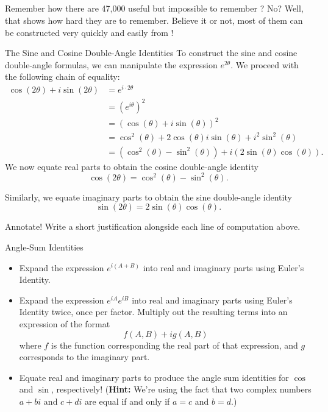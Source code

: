 \subsection{}

Remember how there are 47,000 useful but impossible to remember ?  No?  Well, that shows how hard they are to remember.  Believe it or not, most of them can be constructed very quickly and easily from !  

\begin{example}{The Sine and Cosine Double-Angle Identities}
To construct the sine and cosine double-angle formulas, we can manipulate the expression $e^{2\theta}$.  We proceed with the following chain of equality:
\begin{align*}
\cos(2\theta)+i\sin(2\theta)&=e^{i\cdot 2\theta} \\
&=\left(e^{i\theta} \right)^2 \\
&=\left(\cos(\theta)+i\sin(\theta) \right)^2\\ 
&=\cos^2(\theta)+2\cos(\theta)i\sin(\theta)+i^2\sin^2(\theta)  \\
&=\left(\cos^2(\theta)-\sin^2(\theta)\right)+i\left(2\sin(\theta)\cos(\theta) \right). 
\end{align*}
We now equate real parts to obtain the cosine double-angle identity $$\cos(2\theta)=\cos^2(\theta)-\sin^2(\theta). $$

Similarly, we equate imaginary parts to obtain the sine double-angle identity
$$\sin(2\theta)=2\sin(\theta)\cos(\theta). $$
\end{example}

\begin{exercise}{Annotate! \Coffeecup}
Write a short justification alongside each line of computation above.
\end{exercise}

\begin{exercise}{Angle-Sum Identities \Coffeecup \Coffeecup}
\begin{itemize}
\item Expand the expression $e^{i(A+B)}$ into real and imaginary parts using Euler's Identity.
\vspace*{2in}
\item Expand the expression $e^{iA}e^{iB}$ into real and imaginary parts using Euler's Identity twice, once per factor.  Multiply out the resulting terms into an expression of the format $$f(A,B)+ig(A,B)$$ where $f$ is the function corresponding the real part of that expression, and $g$ corresponds to the imaginary part.
\vspace*{2in}
\item Equate real and imaginary parts to produce the angle sum identities for $\cos$ and $\sin$, respectively!  ({\bf Hint:} We're using the fact that two complex numbers $a+bi$ and $c+di$ are equal if and only if $a=c$ and $b=d$.)
\vspace*{2in}
\end{itemize}
\end{exercise}

